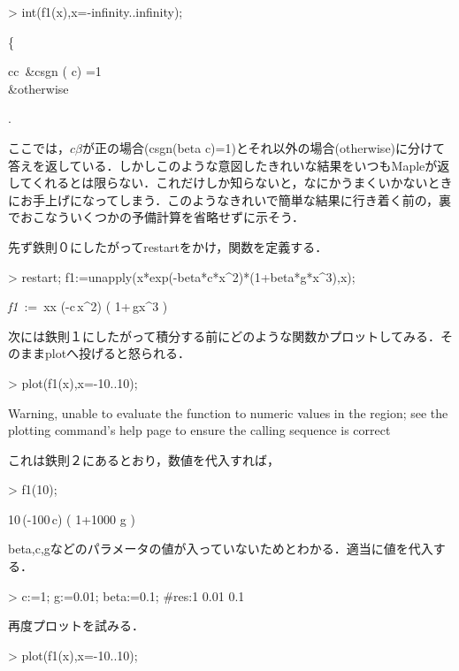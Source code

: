\begin{MapleInput}
> int(f1(x),x=-infinity..infinity);
\end{MapleInput}
\begin{MapleOutput}
\left\{\, \begin {array}{cc} {\displaystyle {}\,}&csgn \left( c\beta \right) =1\\  \infty&otherwise\end {array} \right.
\end{MapleOutput}
ここでは，$c \beta$が正の場合(csgn(beta c)=1)とそれ以外の場合(otherwise)に分けて答えを返している．しかしこのような意図したきれいな結果をいつもMapleが返してくれるとは限らない．これだけしか知らないと，なにかうまくいかないときにお手上げになってしまう．このようなきれいで簡単な結果に行き着く前の，裏でおこなういくつかの予備計算を省略せずに示そう．

先ず鉄則０にしたがってrestartをかけ，関数を定義する．
\begin{MapleInput}
> restart; f1:=unapply(x*exp(-beta*c*x^2)*(1+beta*g*x^3),x);
\end{MapleInput}
\begin{MapleOutput}
{\it f1}\, := \,x\mapsto x \exp(-\beta c\,{x}^{2}) \left( 1+\beta\,g{x}^{3} \right) \end{MapleOutput}
次には鉄則１にしたがって積分する前にどのような関数かプロットしてみる．そのままplotへ投げると怒られる．
\begin{MapleInput}
> plot(f1(x),x=-10..10);
\end{MapleInput}
\begin{MapleError}
Warning, unable to evaluate the function to numeric values in the region; see
the plotting command's help page to ensure the calling sequence is correct
\end{MapleError}
これは鉄則２にあるとおり，数値を代入すれば，
\begin{MapleInput}
> f1(10);
\end{MapleInput}
\begin{MapleOutput}
10\,\exp(-100\,c\beta) \left( 1+1000\,\beta\,g \right)
\end{MapleOutput}

beta,c,gなどのパラメータの値が入っていないためとわかる．適当に値を代入する．
\begin{MapleInput}
> c:=1; g:=0.01; beta:=0.1; #res:1 0.01 0.1
\end{MapleInput}

再度プロットを試みる．
\begin{MapleInput}
> plot(f1(x),x=-10..10);
\end{MapleInput}

